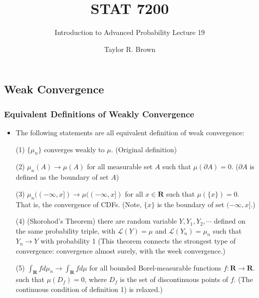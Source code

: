 \documentclass[handout]{beamer}
\title{STAT 7200}
\subtitle{Introduction to Advanced Probability \newline Lecture 19}
\author{Taylor R. Brown}
\institute{}
\date{}
\begin{document}
\frame{\titlepage}


\section[Outline]{}
\frame{\tableofcontents}


\subsection{Weak Convergence}



\frame
{
  \frametitle{Equivalent Definitions of Weakly Convergence} 

   \begin{itemize}

               \item<1->[] \begin{Theorem} The following statements are all equivalent definition of weak convergence:

               (1) $\{\mu_n\}$ converges weakly to $\mu$. (Original definition) 
               \vspace{2mm}
               
                 {\color{blue} (2) $\mu_n(A)\rightarrow \mu(A)$ for all measurable set $A$ such that $\mu(\partial A)=0$. ($\partial A$ is defined as the boundary of set $A$) }
                              \vspace{2mm}

               (3) $\mu_n((-\infty, x])\rightarrow \mu((-\infty, x])$ for all $x\in \mathbf{R}$ such that $\mu(\{x\})=0$. That is, the convergence of CDFs. (Note, $\{x\}$ is the boundary of set $(-\infty, x]$.)
                              \vspace{2mm}

                 {\color{blue}  (4) (Skorohod's Theorem) there are random variable $Y, Y_1, Y_2, \cdots$ defined on the same probability triple, with $\mathcal{L} (Y)=\mu$ and $\mathcal{L} (Y_n)=\mu_n $ such that $Y_n\rightarrow Y$ with probability 1 (This theorem connects the strongest type of convergence: convergence almost surely, with the week convergence.) }
                              \vspace{2mm}

               (5) $\int_{\mathbf{R}}f d\mu_n \rightarrow \int_{\mathbf{R}}f d\mu$ for all bounded Borel-measurable functions $f:\mathbf{R}\rightarrow \mathbf{R}$. such that $\mu(D_f)=0$, where $D_f$ is the set of discontinuous points of $f$. (The continuous condition of definition 1) is relaxed.)
              
                            \end{Theorem}

                                               \end{itemize}
}
\end{document}
